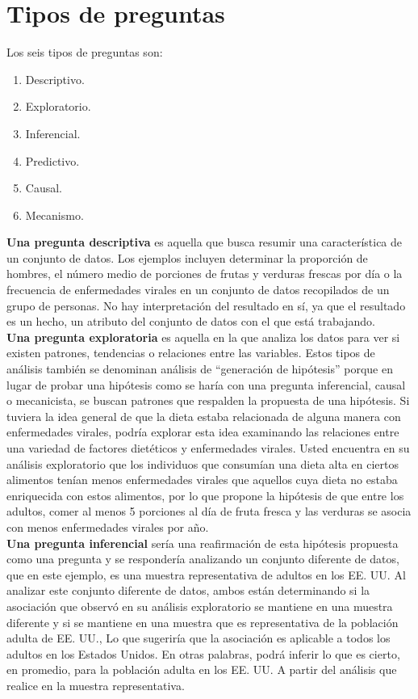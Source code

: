 \documentclass[10pt]{book}
\begin{document}
\section{Tipos de preguntas}
Los seis tipos de preguntas son:
\begin{enumerate}[\bfseries 1.]
\item Descriptivo.
\item Exploratorio.
\item Inferencial.
\item Predictivo.
\item Causal.
\item Mecanismo.
\end{enumerate}
\textbf{Una pregunta descriptiva} es aquella que busca resumir una característica de un conjunto de datos. Los ejemplos incluyen determinar la proporción de hombres, el número medio de porciones de frutas y verduras frescas por día o la frecuencia de enfermedades virales en un conjunto de datos recopilados de un grupo de personas. No hay interpretación del resultado en sí, ya que el resultado es un hecho, un atributo del conjunto de datos con el que está trabajando. \\
\textbf{Una pregunta exploratoria} es aquella en la que analiza los datos para ver si existen patrones, tendencias o relaciones entre las variables. Estos tipos de análisis también se denominan análisis de $“$generación de hipótesis$”$ porque en lugar de probar una hipótesis como se haría con una pregunta inferencial, causal o mecanicista, se buscan patrones que respalden la propuesta de una hipótesis. Si tuviera la idea general de que la dieta estaba relacionada de alguna manera con enfermedades virales, podría explorar esta idea examinando las relaciones entre una variedad de factores dietéticos y enfermedades virales. Usted encuentra en su análisis exploratorio que los individuos que consumían una dieta alta en ciertos alimentos tenían menos enfermedades virales que aquellos cuya dieta no estaba enriquecida con estos alimentos, por lo que propone la hipótesis de que entre los adultos, comer al menos 5 porciones al día de fruta fresca y las verduras se asocia con menos enfermedades virales por año.\\
\textbf{Una pregunta inferencial} sería una reafirmación de esta hipótesis propuesta como una pregunta y se respondería analizando un conjunto diferente de datos, que en este ejemplo, es una muestra representativa de adultos en los EE. UU. Al analizar este conjunto diferente de datos, ambos están determinando si la asociación que observó en su análisis exploratorio se mantiene en una muestra diferente y si se mantiene en una muestra que es representativa de la población adulta de EE. UU., Lo que sugeriría que la asociación es aplicable a todos los adultos en los Estados Unidos. En otras palabras, podrá inferir lo que es cierto, en promedio, para la población adulta en los EE. UU. A partir del análisis que realice en la muestra representativa.\\
\end{document}
